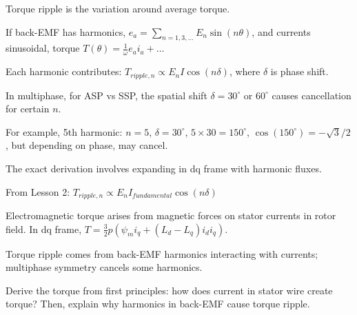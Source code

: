 \documentclass[12pt, a4paper]{article}
\begin{document}
\begin{circuitbox}
Torque ripple is the variation around average torque.

If back-EMF has harmonics, \(e_a = \sum_{n=1,3,\dots} E_n \sin(n \theta)\), and currents sinusoidal, torque \(T(\theta) = \frac{1}{\omega} e_a i_a + \dots\)

Each harmonic contributes: \(T_{ripple,n} \propto E_n I \cos(n \delta)\), where \(\delta\) is phase shift.

In multiphase, for ASP vs SSP, the spatial shift \(\delta = 30^\circ\) or \(60^\circ\) causes cancellation for certain \(n\).

For example, 5th harmonic: \(n=5\), \(\delta=30^\circ\), \(5 \times 30 = 150^\circ\), \(\cos(150^\circ) = -\sqrt{3}/2\), but depending on phase, may cancel.

The exact derivation involves expanding in dq frame with harmonic fluxes.

From Lesson 2: \(T_{ripple,n} \propto E_n I_{fundamental} \cos(n \delta)\)
\end{circuitbox}

\begin{statebox}
Electromagnetic torque arises from magnetic forces on stator currents in rotor field. In dq frame, \(T = \frac{3}{2} p (\psi_m i_q + (L_d - L_q) i_d i_q)\).

Torque ripple comes from back-EMF harmonics interacting with currents; multiphase symmetry cancels some harmonics.
\end{statebox}

\begin{statebox}
Derive the torque from first principles: how does current in stator wire create torque? Then, explain why harmonics in back-EMF cause torque ripple.
\end{statebox}

\end{document}
